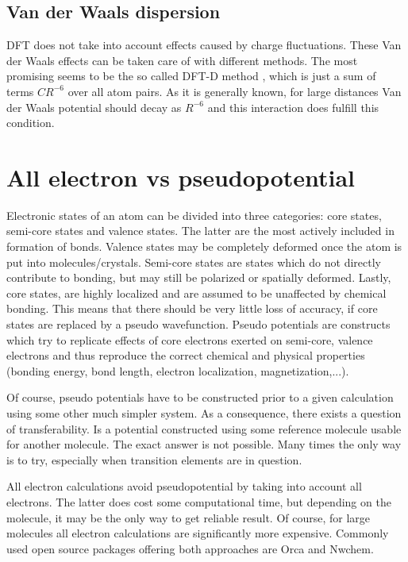 \documentclass[openany, longbibliography,slovene,a4paper,12pt]{article}
\begin{document}
\subsection{Van der Waals dispersion}
DFT does not take into account effects caused by charge fluctuations. These Van
der Waals effects can be taken care of with different methods.
 The most promising seems to be the so called DFT-D method
\cite{consis_accur_ab_initio_param}, which is just a sum of terms $CR^{-6}$
over all atom pairs. As it is generally known, for large distances Van der Waals
potential should decay as $R^{-6}$ and this interaction does fulfill this condition.


\section{All electron vs pseudopotential}
Electronic states of an atom can be divided into three categories: core states,
semi-core states and valence states. The latter are the most actively included
in formation of bonds. Valence states may be completely deformed once the atom
is put into molecules/crystals. Semi-core states are states which do not
directly contribute to bonding, but may still be polarized or spatially
deformed. Lastly, core states, are highly localized and are assumed to be
unaffected by chemical bonding. This means that there should be very little loss
of accuracy, if core states are replaced by a pseudo wavefunction.
Pseudo potentials are constructs which try to
replicate effects of core electrons exerted on semi-core, valence electrons and
thus reproduce the correct chemical and physical properties (bonding energy, bond
length, electron localization, magnetization,...).

Of course, pseudo potentials have to be constructed prior to a given calculation using
some other much simpler system. As a consequence, there
exists a question of transferability. Is a potential constructed using some
reference molecule usable for another molecule. The exact answer is
not possible. Many times the only way is to try, especially when transition
elements are in question.

All electron calculations avoid pseudopotential by taking into account all
electrons. The latter does cost some computational time, but depending on the
molecule, it may be the only way to get reliable result. Of course, for large
molecules all electron calculations are significantly more expensive.
Commonly used open source packages offering both approaches are Orca and Nwchem.
\end{document}

